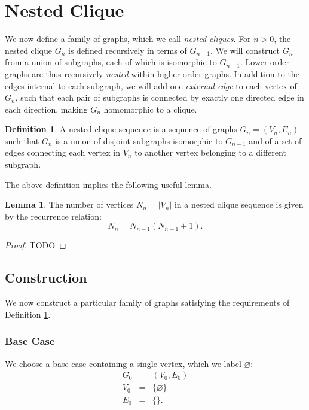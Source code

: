 \documentclass{article}
\theoremstyle{definition}
\newtheorem{definition}{Definition}[section]
\newtheorem{lemma}{Lemma}
\begin{document}
\section{Nested Clique}

We now define a family of graphs, which we call {\em nested cliques}. For $n > 0$, the nested clique $G_n$ is defined recursively in terms of $G_{n-1}$. We will construct $G_n$ from a union of subgraphs, each of which is isomorphic to $G_{n-1}$. Lower-order graphs are thus recursively {\em nested} within higher-order graphs. In addition to the edges internal to each subgraph, we will add one {\em external edge} to each vertex of $G_n$, such that each pair of subgraphs is connected by exactly one directed edge in each direction, making $G_n$ homomorphic to a clique.

\begin{definition} \label{def:nk}
A {nested clique sequence} is a sequence of graphs $G_n = (V_n, E_n)$ such that $G_n$ is a union of disjoint subgraphs isomorphic to $G_{n-1}$ and of a set of edges connecting each vertex in $V_n$ to another vertex belonging to a different subgraph.
\end{definition}

The above definition implies the following useful lemma.
\begin{lemma}
The number of vertices $N_n = |V_n|$ in a nested clique sequence is given by the recurrence relation:
\begin{equation}\label{eq:nn}
N_n = N_{n-1}(N_{n-1} + 1).
\end{equation}
\end{lemma}

\begin{proof}
TODO
\end{proof}

\subsection{Construction}
We now construct a particular family of graphs satisfying the requirements of Definition \ref{def:nk}.

\subsubsection{Base Case}

We choose a base case containing a single vertex, which we label $\varnothing$:
\begin{eqnarray}
G_0 &=& (V_0, E_0) \\
V_0 &=& \{ \varnothing \} \\
E_0 &=& \{\}.
\end{eqnarray}
\end{document}

